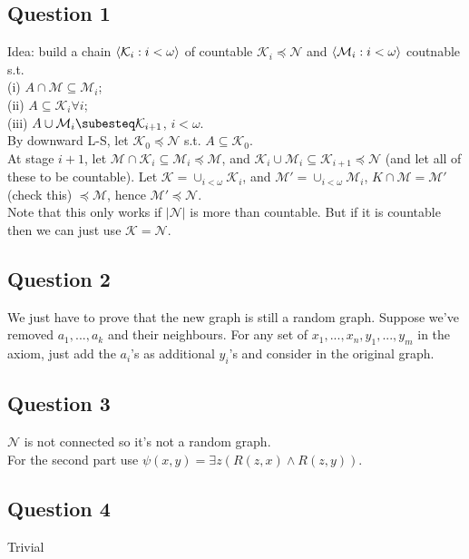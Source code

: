 \documentclass[a4paper]{article}
\begin{document}
\subsection{Question 1}
Idea: build a chain $\langle \mathcal{K}_i:i < \omega\rangle$ of countable $\mathcal{K}_i \preccurlyeq \mathcal{N}$ and $\langle \mathcal{M}_i : i < \omega \rangle$ coutnable s.t. \\
(i) $A \cap \mathcal{M} \subseteq \mathcal{M}_i$;\\
(ii) $A \subseteq \mathcal{K}_i \forall i$;\\
(iii) $A \cup \mathcal{M}_i \subesteq \mathcal{K}_{i+1}$, $i < \omega$.\\
By downward L-S, let $\mathcal{K}_0 \preccurlyeq \mathcal{N}$ s.t. $A \subseteq \mathcal{K}_0$.\\
At stage $i+1$, let $\mathcal{M} \cap \mathcal{K}_i \subseteq \mathcal{M}_i \preccurlyeq\mathcal{M}$, and $\mathcal{K}_i \cup \mathcal{M}_i \subseteq \mathcal{K}_{i+1} \preccurlyeq \mathcal{N}$ (and let all of these to be countable).
Let $\mathcal{K} = \cup_{i < \omega} \mathcal{K}_i$, and $\mathcal{M}' = \cup_{i < \omega} \mathcal{M}_i$, $K \cap \mathcal{M} = \mathcal{M}'$ (check this) $\preccurlyeq \mathcal{M}$, hence $\mathcal{M}' \preccurlyeq \mathcal{N}$.\\
Note that this only works if $|\mathcal{N}|$ is more than countable. But if it is countable then we can just use $\mathcal{K} = \mathcal{N}$.

\subsection{Question 2}
We just have to prove that the new graph is still a random graph. Suppose we've removed $a_1,...,a_k$ and their neighbours. For any set of $x_1,...,x_n,y_1,...,y_m$ in the axiom, just add the $a_i$'s as additional $y_i$'s and consider in the original graph.

\subsection{Question 3}
$\mathcal{N}$ is not connected so it's not a random graph.\\
For the second part use $\psi(x,y) = \exists z(R(z,x) \wedge R(z,y))$.

\subsection{Question 4}
Trivial
\end{document}
